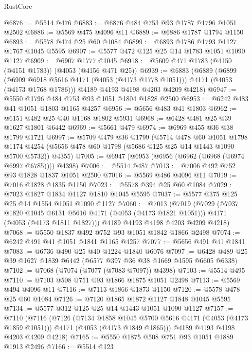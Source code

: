 \begin{lexlean}{RustCore}
\begin{coremodule}
@6876 := @5514 @476
@6883 := @6876 @484 @753 @93 @1787 @1796 @1051 @2502
@6886 := @5569 @475 @4096 @11
@6889 := @6886 @1787 @1794 @1150
@6893 := @5578 @474 @25 @60 @1084
@6899 := @6893 @1786 @1793 @1127 @1767 @1045 @5595
@6907 := @5577 @472 @125 @25 @14 @1783 @1051 @1090 @1127
@6909 := @6907 @1777 @1045
@6918 := @5609 @471 @1783 (@4150 (@4151 @1783)) (@4053 (@4156 @471 @25))
@6939 := @6883
    (@6889
      (@6899
        (@6909 @6918 @5616 @4171 (@4053 (@4173 @1778 @1051)))
        @4171
        (@4053 (@4173 @1768 @1786)))
      @4189
      @4193
      @4198
      @4203
      @4209
      @4218)
@6947 := @5550 @1796 @484 @753 @93 @1051 @1804 @1828 @2500
@6953 := @6242 @483 @41 @1051 @1803 @1165 @4257
@6956 := @5656 @483 @41 @1803
@6962 := @6151 @482 @25 @40 @1168 @1802 @5931
@6968 := @6428 @481 @25 @39 @1627 @1801 @6442
@6969 := @5661 @479
@6974 := @6969 @455 @36 @38 @1799 @1721
@6997 := @5709
    @479
    @36
    @1799
    (@5714
      @478
      @60
      @1051
      @1798
      @1174
      @4254
      (@5656 @478 @60 @1798 (@5686 @125 @25 @14 @1443 @1090 @5700 @5732))
      @4355)
@7005 := @6947 (@6953 (@6956 (@6962 (@6968 (@6974 @6997 @6785)))) @4398)
@7006 := @5514 @487
@7013 := @7006 @492 @752 @93 @1828 @1837 @1051 @2500
@7016 := @5569 @486 @4096 @11
@7019 := @7016 @1828 @1835 @1150
@7023 := @5578 @394 @25 @60 @1084
@7029 := @7023 @1827 @1834 @1127 @1810 @1045 @5595
@7037 := @5577 @375 @125 @25 @14 @1554 @1051 @1090 @1127
@7060 := @7013
    (@7019
      (@7029
        (@7037 @1820 @1045 @6131 @5616 @4171 (@4053 (@4173 @1821 @1051)))
        @4171
        (@4053 (@4173 @1811 @1827)))
      @4189
      @4193
      @4198
      @4203
      @4209
      @4218)
@7068 := @5550 @1837 @492 @752 @93 @1051 @1842 @1866 @2498
@7074 := @6242 @491 @41 @1051 @1841 @1165 @4257
@7077 := @5656 @491 @41 @1841
@7083 := @6736 @490 @25 @40 @1224 @1840 @6076
@7097 := @6428 @489 @25 @39 @1627 @1839 @6442 (@6577 @397 @36 @38 @1669 @1595 @6605 @6338)
@7102 := @7068 (@7074 (@7077 (@7083 @7097)) @4398)
@7103 := @5514 @495
@7110 := @7103 @508 @751 @93 @1866 @1875 @1051 @2498
@7113 := @5569 @494 @4096 @11
@7116 := @7113 @1866 @1873 @1150
@7120 := @5578 @478 @25 @60 @1084
@7126 := @7120 @1865 @1872 @1127 @1848 @1045 @5595
@7134 := @5577 @312 @125 @25 @14 @1443 @1051 @1090 @1127
@7157 := @7110
    (@7116
      (@7126
        (@7134 @1858 @1045 @5700 @5616 @4171 (@4053 (@4173 @1859 @1051)))
        @4171
        (@4053 (@4173 @1849 @1865)))
      @4189
      @4193
      @4198
      @4203
      @4209
      @4218)
@7165 := @5550 @1875 @508 @751 @93 @1051 @1889 @1913 @2496
@7166 := @5514 @123

\end{coremodule}
\end{lexlean}

